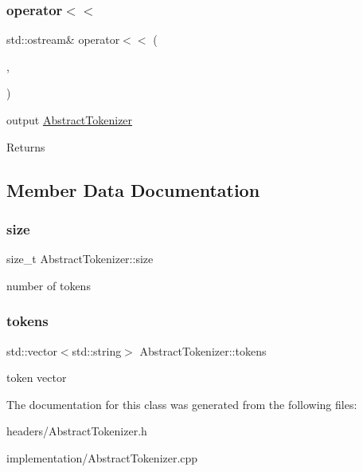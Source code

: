 \subsubsection{\texorpdfstring{operator$<$$<$}{operator<<}}
{\footnotesize\ttfamily std\+::ostream\& operator$<$$<$ (\begin{DoxyParamCaption}\item[{std\+::ostream \&}]{,  }\item[{const \hyperlink{classAbstractTokenizer}{Abstract\+Tokenizer} \&}]{ }\end{DoxyParamCaption})\hspace{0.3cm}{\ttfamily [friend]}}

output \hyperlink{classAbstractTokenizer}{Abstract\+Tokenizer} \begin{DoxyReturn}{Returns}

\end{DoxyReturn}


\subsection{Member Data Documentation}
\mbox{\label{classAbstractTokenizer_a25d4d9be114e714ac362dd64991e0f65}} 
\subsubsection{\texorpdfstring{size}{size}}
{\footnotesize\ttfamily size\+\_\+t Abstract\+Tokenizer\+::size\hspace{0.3cm}{\ttfamily [protected]}}

number of tokens \mbox{\label{classAbstractTokenizer_a76c3d1105c591f92f1036c327acd36f3}} 
\subsubsection{\texorpdfstring{tokens}{tokens}}
{\footnotesize\ttfamily std\+::vector$<$std\+::string$>$ Abstract\+Tokenizer\+::tokens\hspace{0.3cm}{\ttfamily [protected]}}

token vector 

The documentation for this class was generated from the following files\+:\begin{DoxyCompactItemize}
\item 
headers/Abstract\+Tokenizer.\+h\item 
implementation/Abstract\+Tokenizer.\+cpp\end{DoxyCompactItemize}
